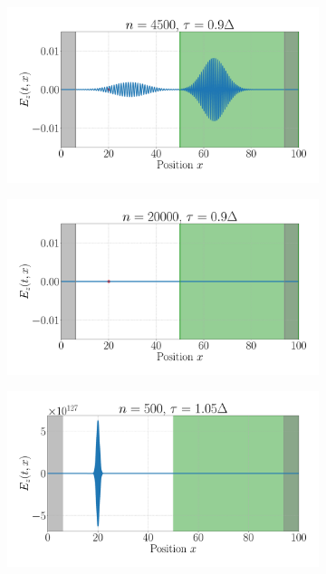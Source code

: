 \documentclass[11pt, A4paper]{article}
\begin{document}
\begin{figure}[h!]
\begin{subfigure}[h]{0.499\textwidth}
         \caption{}
         \label{fig: thick_t60_tau09}
     \end{subfigure}
     \begin{subfigure}[h]{0.499\textwidth}
         \centering
         \includegraphics[width=\textwidth]{Plots/maxwell_tau0.9_thickglass_nmax4500.pdf}
         \caption{}
         \label{fig: thick_t80_tau09}
     \end{subfigure}
     \begin{subfigure}[h]{0.499\textwidth}
         \centering
         \includegraphics[width=\textwidth]{Plots/maxwell_tau0.9_thickglass_nmax20000.pdf}
         \caption{}
         \label{fig: thick_t500_tau09}
     \end{subfigure}
     \begin{subfigure}[h]{0.499\textwidth}
         \centering
         \includegraphics[width=\textwidth]{Plots/maxwell_tau1.05_thickglass_nmax500.pdf}

\end{subfigure}
\end{figure}
\end{document}
